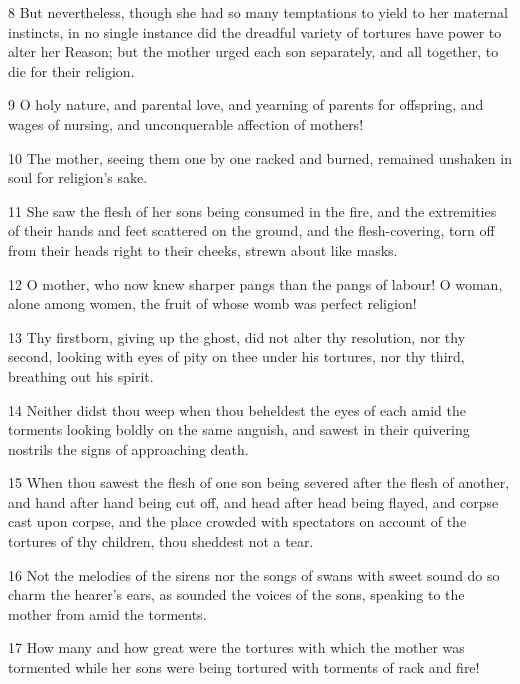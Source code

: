 \par 8 But nevertheless, though she had so many temptations to yield to her maternal instincts, in no single instance did the dreadful variety of tortures have power to alter her Reason; but the mother urged each son separately, and all together, to die for their religion.

\par 9 O holy nature, and parental love, and yearning of parents for offspring, and wages of nursing, and unconquerable affection of mothers!

\par 10 The mother, seeing them one by one racked and burned, remained unshaken in soul for religion's sake.

\par 11 She saw the flesh of her sons being consumed in the fire, and the extremities of their hands and feet scattered on the ground, and the flesh-covering, torn off from their heads right to their cheeks, strewn about like masks.

\par 12 O mother, who now knew sharper pangs than the pangs of labour! O woman, alone among women, the fruit of whose womb was perfect religion!

\par 13 Thy firstborn, giving up the ghost, did not alter thy resolution, nor thy second, looking with eyes of pity on thee under his tortures, nor thy third, breathing out his spirit.

\par 14 Neither didst thou weep when thou beheldest the eyes of each amid the torments looking boldly on the same anguish, and sawest in their quivering nostrils the signs of approaching death.

\par 15 When thou sawest the flesh of one son being severed after the flesh of another, and hand after hand being cut off, and head after head being flayed, and corpse cast upon corpse, and the place crowded with spectators on account of the tortures of thy children, thou sheddest not a tear.

\par 16 Not the melodies of the sirens nor the songs of swans with sweet sound do so charm the hearer's ears, as sounded the voices of the sons, speaking to the mother from amid the torments.

\par 17 How many and how great were the tortures with which the mother was tormented while her sons were being tortured with torments of rack and fire!

